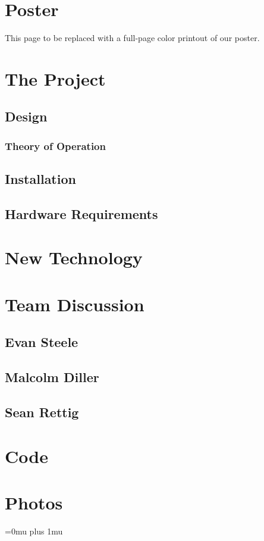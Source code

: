 \documentclass[10pt,draftclsnofoot,onecolumn]{IEEEtran}
\begin{document}
\section{Poster}
\newpage
This page to be replaced with a full-page color printout of our poster.
\newpage
\section{The Project}
\subsection{Design}
\subsubsection{Theory of Operation}
\subsection{Installation}

\subsection{Hardware Requirements}
\section{New Technology}

\section{Team Discussion}
\subsection{Evan Steele}
\subsection{Malcolm Diller}
\subsection{Sean Rettig}
\section{Code}
\section{Photos}
\Urlmuskip=0mu plus 1mu\relax


\end{document}
